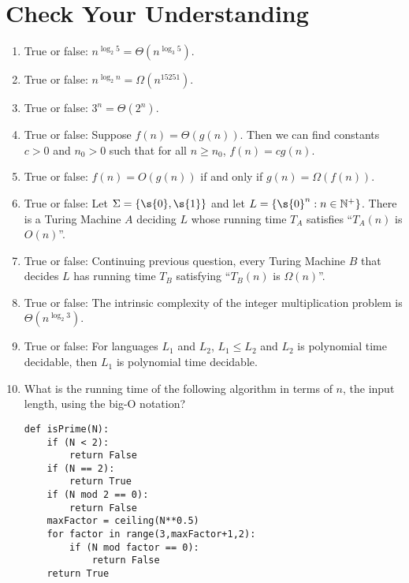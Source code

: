 

\section{Check Your Understanding}

\begin{enumerate}
    \item True or false: $n^{\log_2 5} = \Theta(n^{\log_3 5})$.
    \item True or false: $n^{\log_2 n} = \Omega(n^{15251})$.
    \item True or false: $3^n = \Theta(2^n)$.
    \item True or false: Suppose $f(n) = \Theta(g(n))$. Then we can find constants $c > 0$ and $n_0 > 0$ such that for all $n \geq n_0$, $f(n) = cg(n)$.
    \item True or false: $f(n) = O(g(n))$ if and only if $g(n) = \Omega(f(n))$.
    \item True or false: Let $\Sigma = \{\s{0},\s{1}\}$ and let $L = \{\s{0}^n : n \in \mathbb{N}^+\}$. There is a Turing Machine $A$ deciding $L$ whose running time $T_A$ satisfies ``$T_A(n)$ is $O(n)$''.
    \item True or false: Continuing previous question, every Turing Machine $B$ that decides $L$ has running time $T_B$ satisfying ``$T_B(n)$ is $\Omega(n)$''.
    \item True or false: The intrinsic complexity of the integer multiplication problem is $\Theta(n^{\log_2 3})$.
    \item True or false: For languages $L_1$ and $L_2$, $L_1 \leq L_2$ and $L_2$ is polynomial time decidable, then $L_1$ is polynomial time decidable.
    \item What is the running time of the following algorithm in terms of $n$, the input length, using the big-O notation?
    \begin{verbatim}
def isPrime(N):
    if (N < 2):
        return False
    if (N == 2):
        return True
    if (N mod 2 == 0):
        return False
    maxFactor = ceiling(N**0.5)
    for factor in range(3,maxFactor+1,2):
        if (N mod factor == 0):
            return False
    return True
\end{verbatim}
\end{enumerate}




